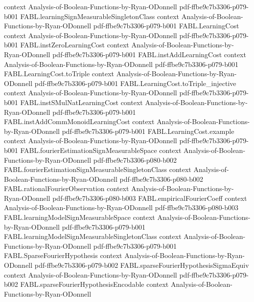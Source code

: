\begin{theorem}
  {context}
  {Analysis-of-Boolean-Functions-by-Ryan-ODonnell}
  {pdf-ffbe9c7b3306-p079-b001}
\proofstep
  {FABL.learningSignMeasurableSingletonClass}
  {context}
  {Analysis-of-Boolean-Functions-by-Ryan-ODonnell}
  {pdf-ffbe9c7b3306-p079-b001}
\proofstep
  {FABL.LearningCost}
  {context}
  {Analysis-of-Boolean-Functions-by-Ryan-ODonnell}
  {pdf-ffbe9c7b3306-p079-b001}
\proofstep
  {FABL.instZeroLearningCost}
  {context}
  {Analysis-of-Boolean-Functions-by-Ryan-ODonnell}
  {pdf-ffbe9c7b3306-p079-b001}
\proofstep
  {FABL.instAddLearningCost}
  {context}
  {Analysis-of-Boolean-Functions-by-Ryan-ODonnell}
  {pdf-ffbe9c7b3306-p079-b001}
\proofstep
  {FABL.LearningCost.toTriple}
  {context}
  {Analysis-of-Boolean-Functions-by-Ryan-ODonnell}
  {pdf-ffbe9c7b3306-p079-b001}
\proofstep
  {FABL.LearningCost.toTriple_injective}
  {context}
  {Analysis-of-Boolean-Functions-by-Ryan-ODonnell}
  {pdf-ffbe9c7b3306-p079-b001}
\proofstep
  {FABL.instSMulNatLearningCost}
  {context}
  {Analysis-of-Boolean-Functions-by-Ryan-ODonnell}
  {pdf-ffbe9c7b3306-p079-b001}
\proofstep
  {FABL.instAddCommMonoidLearningCost}
  {context}
  {Analysis-of-Boolean-Functions-by-Ryan-ODonnell}
  {pdf-ffbe9c7b3306-p079-b001}
\proofstep
  {FABL.LearningCost.example}
  {context}
  {Analysis-of-Boolean-Functions-by-Ryan-ODonnell}
  {pdf-ffbe9c7b3306-p079-b001}
\proofstep
  {FABL.fourierEstimationSignMeasurableSpace}
  {context}
  {Analysis-of-Boolean-Functions-by-Ryan-ODonnell}
  {pdf-ffbe9c7b3306-p080-b002}
\proofstep
  {FABL.fourierEstimationSignMeasurableSingletonClass}
  {context}
  {Analysis-of-Boolean-Functions-by-Ryan-ODonnell}
  {pdf-ffbe9c7b3306-p080-b002}
\proofstep
  {FABL.rationalFourierObservation}
  {context}
  {Analysis-of-Boolean-Functions-by-Ryan-ODonnell}
  {pdf-ffbe9c7b3306-p080-b003}
\proofstep
  {FABL.empiricalFourierCoeff}
  {context}
  {Analysis-of-Boolean-Functions-by-Ryan-ODonnell}
  {pdf-ffbe9c7b3306-p080-b003}
\proofstep
  {FABL.learningModelSignMeasurableSpace}
  {context}
  {Analysis-of-Boolean-Functions-by-Ryan-ODonnell}
  {pdf-ffbe9c7b3306-p079-b001}
\proofstep
  {FABL.learningModelSignMeasurableSingletonClass}
  {context}
  {Analysis-of-Boolean-Functions-by-Ryan-ODonnell}
  {pdf-ffbe9c7b3306-p079-b001}
\proofstep
  {FABL.SparseFourierHypothesis}
  {context}
  {Analysis-of-Boolean-Functions-by-Ryan-ODonnell}
  {pdf-ffbe9c7b3306-p079-b002}
\proofstep
  {FABL.sparseFourierHypothesisSigmaEquiv}
  {context}
  {Analysis-of-Boolean-Functions-by-Ryan-ODonnell}
  {pdf-ffbe9c7b3306-p079-b002}
\proofstep
  {FABL.sparseFourierHypothesisEncodable}
  {context}
  {Analysis-of-Boolean-Functions-by-Ryan-ODonnell}

\end{theorem}
